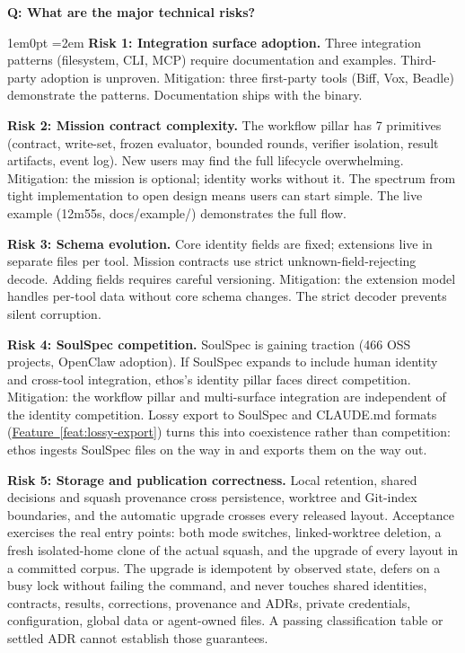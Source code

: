 \documentclass[11pt,letterpaper]{article}
\newcounter{faqnum}
\newenvironment{faqpair}[1]{%
  \needspace{4\baselineskip}%
  \vspace{0.5em}%
  \refstepcounter{faqnum}%
  \noindent\textbf{\color{SectionBlue}Q\thefaqnum: #1}\par\nopagebreak[4]%
  \vspace{0.2em}%
  \begin{adjustwidth}{1em}{0pt}%
  \setlength{\parindent}{0pt}%
  \emergencystretch=2em%
}{%
  \end{adjustwidth}%
  \vspace{0.5em}%
}
\newcommand{\featureref}[1]{\hyperref[#1]{Feature~\ref*{#1}}}
\begin{document}
\begin{faqpair}{What are the major technical risks?}\label{faq:architecture}
\textbf{Risk 1: Integration surface adoption.} Three integration patterns (filesystem, CLI, MCP) require documentation and examples. Third-party adoption is unproven. Mitigation: three first-party tools (Biff, Vox, Beadle) demonstrate the patterns. Documentation ships with the binary.

\textbf{Risk 2: Mission contract complexity.} The workflow pillar has 7 primitives (contract, write-set, frozen evaluator, bounded rounds, verifier isolation, result artifacts, event log). New users may find the full lifecycle overwhelming. Mitigation: the mission is optional; identity works without it. The spectrum from tight implementation to open design means users can start simple. The live example (12m55s, docs/example/) demonstrates the full flow.

\textbf{Risk 3: Schema evolution.} Core identity fields are fixed; extensions live in separate files per tool. Mission contracts use strict unknown-field-rejecting decode. Adding fields requires careful versioning. Mitigation: the extension model handles per-tool data without core schema changes. The strict decoder prevents silent corruption.

\textbf{Risk 4: SoulSpec competition.} SoulSpec is gaining traction (466 OSS projects, OpenClaw adoption). If SoulSpec expands to include human identity and cross-tool integration, ethos's identity pillar faces direct competition. Mitigation: the workflow pillar and multi-surface integration are independent of the identity competition. Lossy export to SoulSpec and CLAUDE.md formats (\featureref{feat:lossy-export}) turns this into coexistence rather than competition: ethos ingests SoulSpec files on the way in and exports them on the way out.

\textbf{Risk 5: Storage and publication correctness.} Local retention, shared decisions and squash provenance cross persistence, worktree and Git-index boundaries, and the automatic upgrade crosses every released layout. Acceptance exercises the real entry points: both mode switches, linked-worktree deletion, a fresh isolated-home clone of the actual squash, and the upgrade of every layout in a committed corpus. The upgrade is idempotent by observed state, defers on a busy lock without failing the command, and never touches shared identities, contracts, results, corrections, provenance and ADRs, private credentials, configuration, global data or agent-owned files. A passing classification table or settled ADR cannot establish those guarantees.
\end{faqpair}
\end{document}
